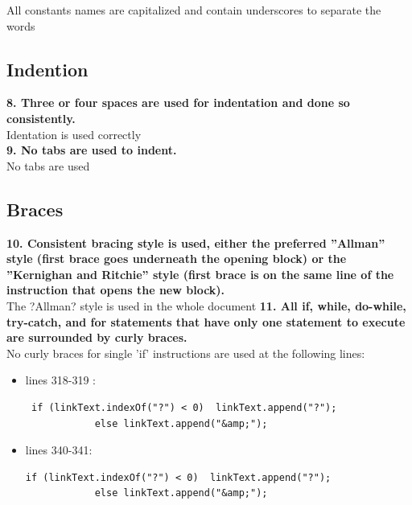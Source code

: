 \documentclass{article}
\begin{document}
\begin{flushleft}
All constants names are capitalized and contain underscores to separate the words  \\
\vspace{0.5cm}




\subsection{Indention}
\textbf{8. Three or four spaces are used for indentation and done so consistently.}\\
\vspace{0.5cm}
Identation is used correctly\\
\vspace{0.5cm}
\textbf{9. No tabs are used to indent.}\\
\vspace{0.5cm}
No tabs are used \\
\vspace{0.5cm}





\subsection{Braces}
\textbf{10. Consistent bracing style is used, either the preferred ''Allman'' style (first brace goes underneath the opening block) or the ''Kernighan and Ritchie'' style (first brace is on the same line of the instruction that opens the new block).}\\
The ?Allman? style is used in the whole document
\textbf{11. All if, while, do-while, try-catch, and for statements that have only one statement to execute are surrounded by curly braces.}\\
No curly braces for single 'if' instructions are used at the following lines:
\begin{itemize}
\item lines 318-319 :
\begin{lstlisting}
 if (linkText.indexOf("?") < 0)  linkText.append("?");
            else linkText.append("&amp;");
\end{lstlisting}
\item lines 340-341:
\begin{lstlisting}
if (linkText.indexOf("?") < 0)  linkText.append("?");
            else linkText.append("&amp;"); 
  \end{lstlisting}
\end{itemize}





\end{flushleft}
\end{document}
